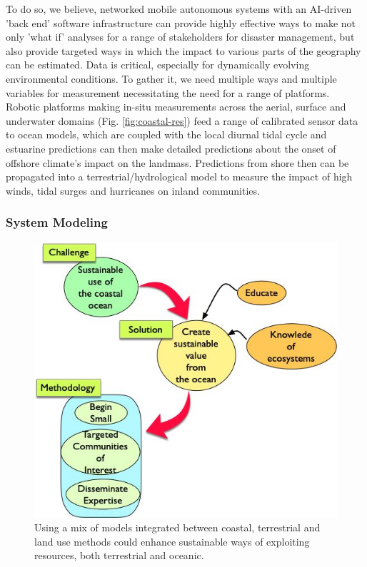 To do so, we believe, networked mobile autonomous systems with an
AI-driven 'back end' software infrastructure can provide highly
effective ways to make not only 'what if' analyses for a range of
stakeholders for disaster management, but also provide targeted ways
in which the impact to various parts of the geography can be
estimated. Data is critical, especially for dynamically evolving
environmental conditions. To gather it, we need multiple ways and
multiple variables for measurement necessitating the need for a range
of platforms. Robotic platforms making in-situ measurements across the
aerial, surface and underwater domains (Fig. \ref{fig:coastal-res})
feed a range of calibrated sensor data to ocean models, which are
coupled with the local diurnal tidal cycle and estuarine predictions
can then make detailed predictions about the onset of offshore
climate's impact on the landmass. Predictions from shore then can be
propagated into a terrestrial/hydrological model to measure the impact
of high winds, tidal surges and hurricanes on inland communities.


\subsubsection*{System Modeling}


\begin{figure}
  \centering
  \includegraphics[scale=0.40]{fig/Ericeira-method.jpg}
  \caption{Using a mix of models integrated between coastal, terrestrial
    and land use methods could enhance sustainable ways of exploiting
    resources, both terrestrial and oceanic.}
  \label{fig:method}
\end{figure}


